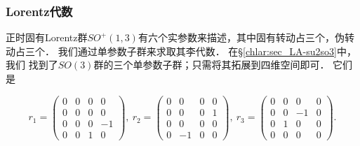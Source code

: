 \subsubsection{Lorentz代数}
正时固有Lorentz群$SO^{+}(1,3)$有六个实参数来描述，其中固有转动占三个，伪转动占三个．
我们通过单参数子群来求取其李代数．
在\S\ref{chlar:sec_LA-su2so3}中，我们
找到了$SO(3)$群的三个单参数子群；只需将其拓展到四维空间即可．
它们是
\begin{small}
\begin{equation}\label{chlg:eqn_LA-so13-r}
    r_1=\begin{pmatrix}
        0&0&0&0\\
        0&0 & 0 & 0 \\
        0&0& 0 & -1 \\
        0&0 & 1 & 0
    \end{pmatrix},\ 
    r_2=\begin{pmatrix}
        0&0&0&0\\
        0&0 & 0 & 1 \\
        0&0 & 0 & 0 \\
        0&-1 & 0 & 0
    \end{pmatrix},\ 
    r_3=\begin{pmatrix}
        0&0&0&0\\
        0&0 & - 1 & 0 \\
        0&1& 0 & 0 \\
        0&0 & 0 & 0
    \end{pmatrix} .
\end{equation}
\end{small}

